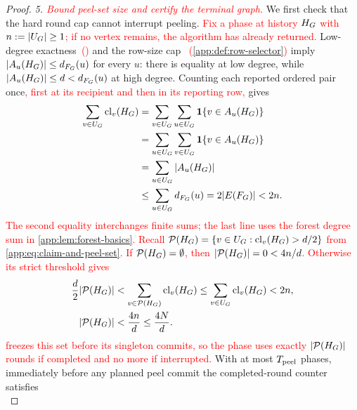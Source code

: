 \begin{proof}
\emph{5. \textcolor{red}{Bound peel-set size and certify the terminal graph.}}
We first check that the hard round cap cannot interrupt peeling.
\textcolor{red}{Fix a phase at history $H_{G}$ with
$n:=|U_{G}|\ge1$; if no vertex remains, the algorithm has
already returned.}
Low-degree exactness\textcolor{red}{~(\AppLowDegreeScreenRef)} and the row-size cap\textcolor{red}{~%
(\cref{app:def:row-selector})} imply
$|A_{u}(H_{G})|\le d_{F_{G}}(u)$ for every $u$:
there is equality at low degree, while
$|A_{u}(H_{G})|\le d<d_{F_{G}}(u)$ at high degree.
Counting each reported ordered pair once\textcolor{red}{, first at its
recipient and then in its reporting row,} gives
{\color{red}
\begin{align}
 \sum_{v\in U_{G}}\operatorname{cl}_{v}(H_{G})
 &=\sum_{v\in U_{G}}\sum_{u\in U_{G}}
       \mathbf 1\{v\in A_{u}(H_{G})\}\notag\\
 &=\sum_{u\in U_{G}}\sum_{v\in U_{G}}
       \mathbf 1\{v\in A_{u}(H_{G})\}\notag\\
 &=\sum_{u\in U_{G}}|A_{u}(H_{G})|\notag\\
 &\le\sum_{u\in U_{G}}d_{F_{G}}(u)
 =2|E(F_{G})|<2n.
 \label{app:eq:total-claim-bound}
\end{align}}
\textcolor{red}{The second equality interchanges finite sums; the last line
uses the forest degree sum in \cref{app:lem:forest-basics}.
Recall $\mathcal P(H_{G})=\{v\in U_{G}:\operatorname{cl}_{v}(H_{G})>d/2\}$
from \cref{app:eq:claim-and-peel-set}.
If $\mathcal P(H_{G})=\emptyset$, then $|\mathcal P(H_{G})|=0<4n/d$.
Otherwise its strict threshold gives}
{\color{red}
\begin{equation}
 \begin{aligned}
 \frac{d}{2}|\mathcal P(H_{G})|
 &<\sum_{v\in\mathcal P(H_{G})}\operatorname{cl}_{v}(H_{G})
 \le\sum_{v\in U_{G}}\operatorname{cl}_{v}(H_{G})<2n,\\
 |\mathcal P(H_{G})|&<\frac{4n}{d}\le\frac{4N}{d}.
 \end{aligned}
 \label{app:eq:peel-set-size-proof}
\end{equation}}
\textcolor{red}{ freezes this set before its singleton
commits, so the phase uses exactly $|\mathcal P(H_{G})|$ rounds if completed and no
more if interrupted.}
With at most $T_{\mathrm{peel}}$ phases, immediately before any planned peel
commit the completed-round counter satisfies
{\color{red}
\begin{equation}

\end{equation}}
\end{proof}
